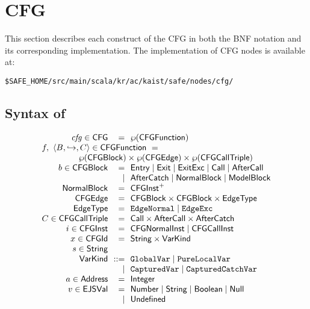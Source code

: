 \chapter{CFG}
This section describes each construct of the \safe CFG
in both the BNF notation and its corresponding implementation.
The implementation of CFG nodes is available at:
\begin{verbatim}
$SAFE_HOME/src/main/scala/kr/ac/kaist/safe/nodes/cfg/
\end{verbatim}

\section{Syntax of \CFG}
\small
\[
\begin{array}{r@{~~}r@{~~}l@{}ll}
\embox{cfg} \in \CFG & = & \powerset{\CFGFunction} & \\
\multicolumn{3}{l}{f,\ \langle B, \hookrightarrow, C \rangle \in \CFGFunction \ =}\\
\multicolumn{3}{r}{
 \powerset{\CFGBlock} \times \powerset{\CFGEdge}
\times \powerset{\CFGCallTriple}} & \\
b \in \CFGBlock & = & \multicolumn{2}{@{}l}{\Entry \mid \Exit \mid \ExitExc \mid \Call \mid \AfterCall}\\
&\mid& \multicolumn{2}{@{}l}{\AfterCatch \mid \NormalBlock \mid \ModelBlock} \\
\NormalBlock & = & \CFGInst^+ & \\
\CFGEdge & = & \CFGBlock \times \CFGBlock \times \EdgeType & \\
\EdgeType & = & \EdgeNormal \mid \EdgeExc & \\
C \in \CFGCallTriple & = & \Call \times \AfterCall \times \AfterCatch & \\

i \in \CFGInst & = & \CFGNormalInst \mid \CFGCallInst &
\\

x \in \CFGId & = & \String \times \SF{VarKind} &
\\

s \in \String &&&\\

\SF{VarKind} & ::= &
\multicolumn{2}{@{} l}{
\TT{GlobalVar} \mid \TT{PureLocalVar}}\\
&  \mid & \TT{CapturedVar} \mid \TT{CapturedCatchVar}
\\

a \in \SF{Address} & = & \SF{Integer} &
\\

v \in \SF{EJSVal} & = &
\multicolumn{2}{@{} l}{
 \SF{Number} \mid \String \mid \SF{Boolean} \mid \SF{Null}}\\
& \mid &\SF{Undefined}
\end{array}
\]

